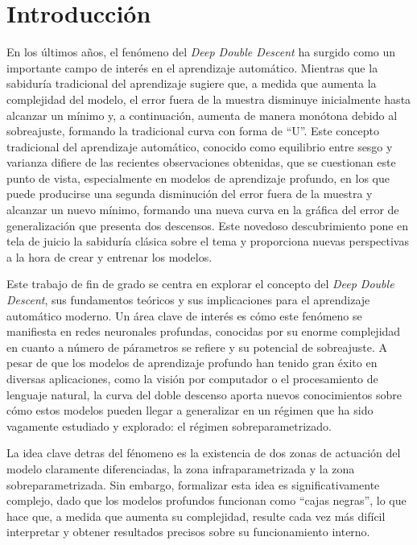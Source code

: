 %


\chapter{Introducción}

En los últimos años, el fenómeno del \emph{Deep Double Descent} ha surgido como un importante campo de interés en el aprendizaje automático. Mientras que la sabiduría tradicional del aprendizaje sugiere que, a medida que aumenta la complejidad del modelo, el error fuera de la muestra disminuye inicialmente hasta alcanzar un mínimo y, a continuación, aumenta de manera monótona debido al sobreajuste, formando la tradicional curva con forma de ``U''. Este concepto tradicional del aprendizaje automático, conocido como equilibrio entre sesgo y varianza difiere de las recientes observaciones obtenidas, que se cuestionan este punto de vista, especialmente en modelos de aprendizaje profundo, en los que puede producirse una segunda disminución del error fuera de la muestra y alcanzar un nuevo mínimo, formando una nueva curva en la gráfica del error de generalización que presenta dos descensos. Este novedoso descubrimiento pone en tela de juicio la sabiduría clásica sobre el tema y proporciona nuevas perspectivas a la hora de crear y entrenar los modelos.\newline

Este trabajo de fin de grado se centra en explorar el concepto del \emph{Deep Double Descent}, sus fundamentos teóricos y sus implicaciones para el aprendizaje automático moderno. Un área clave de interés es cómo este fenómeno se manifiesta en redes neuronales profundas, conocidas por su enorme complejidad en cuanto a número de párametros se refiere y su potencial de sobreajuste. A pesar de que los modelos de aprendizaje profundo han tenido gran éxito en diversas aplicaciones, como la visión por computador o el procesamiento de lenguaje natural, la curva del doble descenso aporta nuevos conocimientos sobre cómo estos modelos pueden llegar a generalizar en un régimen que ha sido vagamente estudiado y explorado: el régimen sobreparametrizado.\newline

La idea clave detras del fénomeno es la existencia de dos zonas de actuación del modelo claramente diferenciadas, la zona infraparametrizada y la zona sobreparametrizada. Sin embargo, formalizar esta idea es significativamente complejo, dado que los modelos profundos funcionan como ``cajas negras'', lo que hace que, a medida que aumenta su complejidad, resulte cada vez más difícil interpretar y obtener resultados precisos sobre su funcionamiento interno.\newline

